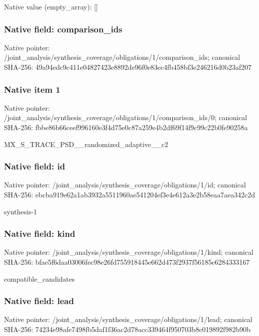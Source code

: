 \documentclass[10pt,a4paper]{article}
\begin{document}
Native value (empty\_\allowbreak{}array): []

\subsubsection{Native field: comparison\_\allowbreak{}ids}
Native pointer: /joint\_\allowbreak{}analysis/synthesis\_\allowbreak{}coverage/obligations/1/comparison\_\allowbreak{}ids; canonical SHA-256: 49a94edc9c411e04827423e8892de96f0e83ec4fb458bf3e246216d0b23af207

\subsubsection{Native item 1}
Native pointer: /joint\_\allowbreak{}analysis/synthesis\_\allowbreak{}coverage/obligations/1/comparison\_\allowbreak{}ids/0; canonical SHA-256: fbbe86b66ceef996160e3f4d75e0c87a259e4b2df69f14f9c99c22b0fe90258a

\begingroup\raggedright\sloppy MX\_\allowbreak{}S\_\allowbreak{}TRACE\_\allowbreak{}PSD\_\allowbreak{}\_\allowbreak{}randomized\_\allowbreak{}adaptive\_\allowbreak{}\_\allowbreak{}c2\par\endgroup

\subsubsection{Native field: id}
Native pointer: /joint\_\allowbreak{}analysis/synthesis\_\allowbreak{}coverage/obligations/1/id; canonical SHA-256: ebcba919e62a1ab3932a5511960ae541204ef3e4e612a3e2b58eaa7aea342c2d

\begingroup\raggedright\sloppy synthesis-1\par\endgroup

\subsubsection{Native field: kind}
Native pointer: /joint\_\allowbreak{}analysis/synthesis\_\allowbreak{}coverage/obligations/1/kind; canonical SHA-256: bfae5f6daa03006fec98e26fd755918445e662d473f2937f56185e6284333167

\begingroup\raggedright\sloppy compatible\_\allowbreak{}candidates\par\endgroup

\subsubsection{Native field: lead}
Native pointer: /joint\_\allowbreak{}analysis/synthesis\_\allowbreak{}coverage/obligations/1/lead; canonical SHA-256: 74234e98afe7498fb5daf1f36ac2d78acc339464f950703b8c019892f982b90b
\end{document}

